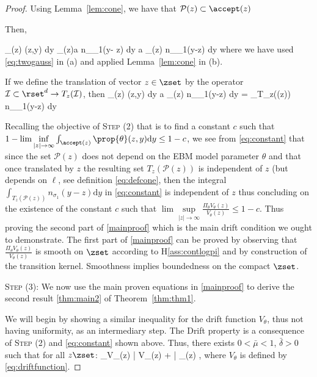 \documentclass[10pt,twocolumn,letterpaper]{article}
\begin{document}
\begin{proof}
Using Lemma~\ref{lem:cone}, we have that $\mathcal{P}(z) \subset \accept(z)$

Then,  

\beq 
 \int_{\accept(z)} \prop{\theta}(z,y)  \textrm{d}y   \int_{\accept(z)}a n_{\sigma_1}(y- z)  \textrm{d}y  a \int_{(z)}  n_{\sigma_1}(y-z)  \textrm{d}y
 \eeq
where we have used \eqref{eq:twogauss} in (a) and applied Lemma~\ref{lem:cone} in (b).

If we define the translation of vector $z \in \zset$ by the operator $\mathcal{I} \subset \rset^d \to T_z(\mathcal{I})$, then
\beq\label{eq:constant}
 \int_{\accept(z)} \prop{\theta}(z,y)  \textrm{d}y \geq a \int_{(z)}  n_{\sigma_1}(y-z)  \textrm{d}y =  \int_{T_z((z))}  n_{\sigma_1}(y-z)  \textrm{d}y
\eeq


Recalling the objective of \noindent \textsc{Step (2)} that is to find a constant $c$ such that $1 - \lim \inf \limits_{|z| \to \infty}  \int_{\accept(z)} \prop{\theta}(z,y)  \textrm{d}y \leq 1 - c$, we see from \eqref{eq:constant} that since the set $\mathcal{P}(z)$ does not depend on the EBM model parameter $\theta$ and that once translated by $z$ the resulting set $T_z(\mathcal{P}(z))$ is independent of $z$ (but depends on $\ell$, see definition \eqref{eq:defcone}, then the integral $ \int_{T_z(\mathcal{P}(z))}  n_{\sigma_1}(y-z)  \textrm{d}y$ in \eqref{eq:constant} is independent of $z$ thus concluding on the existence of the constant $c$ such that $\lim \sup \limits_{|z| \to \infty}  \frac{\Pi_\theta V_\theta(z)}{V_\theta(z)} \leq 1- c$. Thus proving the second part of \eqref{mainproof} which is the main drift condition we ought to demonstrate.
The first part of \eqref{mainproof} can be proved by observing that $  \frac{\Pi_\theta V_\theta(z)}{V_\theta(z)} $ is smooth on $\zset$ according to H\ref{ass:contlogpi} and by construction of the transition kernel. Smoothness implies boundedness on the compact $\zset$.


\medskip
\noindent \textsc{Step (3): } 
We now use the main proven equations in \eqref{mainproof} to derive the second result \eqref{thm:main2} of Theorem~\ref{thm:thm1}.

We will begin by showing a similar inequality for the drift function $V_\theta$, thus not having uniformity, as an intermediary step.
The Drift property is a consequence of \textsc{Step (2)} and \eqref{eq:constant} shown above.
Thus, there exists $0 < \bar{\mu} < 1$, $\bar{\delta} > 0$ such that for all $z \zset$:
\beq\label{eq:driftvtheta}
\Pi_\theta V_\theta(z) \leq \bar{\mu} V_\theta(z) + \bar{\delta} _{}(z) \eqsp,
\eeq
where $V_\theta$ is defined by \eqref{eq:driftfunction}.


\end{proof}
\end{document}
